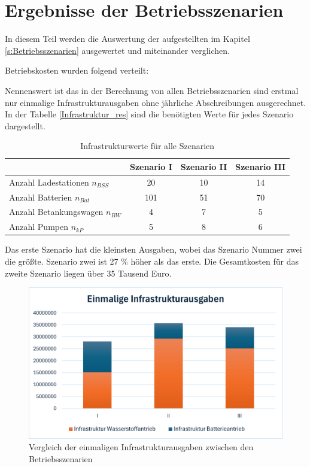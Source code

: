 \section{Ergebnisse der Betriebsszenarien}
In diesem Teil werden die Auswertung der aufgestellten im Kapitel \ref{s:Betriebsszenarien} ausgewertet und miteinander verglichen.

Betriebskosten wurden folgend verteilt:

Nennenswert ist das in der Berechnung von allen Betriebsszenarien sind erstmal nur einmalige Infrastrukturausgaben 
ohne jährliche Abschreibungen ausgerechnet. In der Tabelle \ref{Infrastruktur_res} sind die benötigten Werte für jedes Szenario dargestellt.

\begin{table}[h]
	\begin{center}
    \caption{Infrastrukturwerte für alle Szenarien}
	\label{Infrastrukturwerte_res}
	\begin{tabular}{|l|c|c|c|}
		\hline
		 & \textbf{Szenario I}& \textbf{Szenario II}& \textbf{Szenario III} \\ \hline
		Anzahl Ladestationen $n_{BSS}$ & 20 & 10& 14\\ \hline
		Anzahl Batterien $n_{Bat}$ & 101 & 51& 70 \\ \hline
		Anzahl Betankungswagen $n_{BW}$ & 4 & 7 & 5\\ \hline
		Anzahl Pumpen $n_{kP}$  & 5 & 8 & 6\\ \hline
	\end{tabular}
    \end{center}
\end{table}

Das erste Szenario hat die kleinsten Ausgaben, wobei das Szenario Nummer zwei die größte. Szenario zwei ist 27 \% höher als das erste.
Die Gesamtkosten für das zweite Szenario liegen über 35 Tausend Euro.
\begin{figure}[h]
	\centering
	\includegraphics[width=0.8\linewidth]{Bilder/Infr_Szenarien.png}
	\caption[Betriebsszenarien]{Vergleich der einmaligen Infrastrukturausgaben zwischen den Betriebsszenarien}
	\label{res_betriebsszenarien}
\end{figure}
